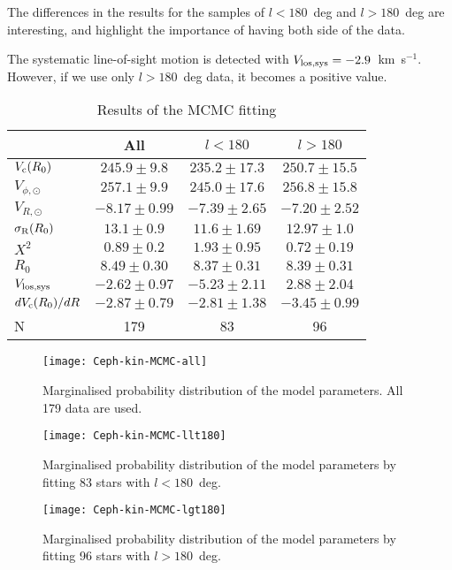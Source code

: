 \documentclass[11pt,a4paper]{article}
\begin{document}
The differences in the results for the samples of $l<180$~deg and $l>180$~deg are interesting, and highlight the importance of having both side of the data. 

The systematic line-of-sight motion is detected with $V_{\rm los,sys}=-2.9$~km~s$^{-1}$. However, if we use only $l>180$~deg data, it becomes a positive value. 

\begin{table}
\centering
 \caption{Results of the MCMC fitting}
 \label{tab:MCMC-res}
 \begin{tabular}{lccc}
  \hline
 & All & $l<180$ & $l>180$ \\
 \hline
 $V_{\rm c}(R_0)$ & $245.9\pm9.8$ & $235.2\pm17.3$ & $250.7\pm15.5$ \\
 $V_{\phi,\odot}$ & $257.1\pm9.9$ &  $245.0\pm17.6$  & $256.8\pm15.8$  \\
 $V_{R,\odot}$ & $-8.17\pm0.99$  & $-7.39\pm2.65$  & $-7.20\pm2.52$ \\
 $\sigma_{\rm R}(R_0)$ & $13.1\pm0.9$ & $11.6\pm1.69$  & $12.97\pm1.0$ \\
 $X^2$ & $0.89\pm0.2$ & $1.93\pm0.95$  & $0.72\pm0.19$ \\
 $R_0$ & $8.49\pm0.30$ & $8.37\pm0.31$ & $8.39\pm0.31$  \\
 $V_{\rm los,sys}$ & $-2.62\pm0.97$ & $-5.23\pm2.11$  & $2.88\pm2.04$ \\
 $dV_{\rm c}(R_0)/dR$ & $-2.87\pm0.79$ & $-2.81\pm1.38$ & $-3.45\pm0.99$ \\
 N & 179 & 83 & 96 \\
\hline
\end{tabular}
\end{table}


\begin{figure}
\leavevmode
\texttt{[image: Ceph-kin-MCMC-all]}
\caption{\small
Marginalised probability distribution of the model parameters. All 179 data are used.
}
\label{fig-mcmcall}
\end{figure}

\begin{figure}
\leavevmode
\texttt{[image: Ceph-kin-MCMC-llt180]}
\caption{\small
Marginalised probability distribution of the model parameters by fitting 83 stars with $l<180$~deg.
}
\label{fig-mcmcllt180}
\end{figure}

\begin{figure}
\leavevmode
\texttt{[image: Ceph-kin-MCMC-lgt180]}
\caption{\small
Marginalised probability distribution of the model parameters by fitting 96 stars with $l>180$~deg.
}
\label{fig-mcmclgt180}
\end{figure}

 



\footnotesize

\setlength{\baselineskip}{0pt}
\setlength{\bibsep}{0pt}

\end{document}
